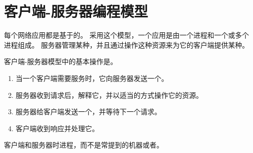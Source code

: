 
\section{客户端-服务器编程模型}
{
    每个网络应用都是基于的。
    采用这个模型，一个应用是由一个进程和一个或多个进程组成。
    服务器管理某种，并且通过操作这种资源来为它的客户端提供某种。

    客户端-服务器模型中的基本操作是。

    \begin{enumerate}
        \item 当一个客户端需要服务时，它向服务器发送一个。
        \item 服务器收到请求后，解释它，并以适当的方式操作它的资源。
        \item 服务器给客户端发送一个，并等待下一个请求。
        \item 客户端收到响应并处理它。
    \end{enumerate}

    客户端和服务器时进程，而不是常提到的机器或者。
}
